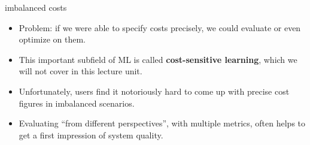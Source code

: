 \documentclass[11pt,compress,t,notes=noshow, xcolor=table]{beamer}
\begin{document}
\begin{vbframe}{imbalanced costs}
\lz

\begin{itemize}
  \item Problem: if we were able to specify costs precisely, we could evaluate 
  or even optimize on them.
  \item This important subfield of ML is called \textbf{cost-sensitive 
  learning}, which we will not cover in this lecture unit.
  \item Unfortunately, users find it notoriously hard to come up with 
  precise cost figures in imbalanced scenarios.
  \item Evaluating \enquote{from different perspectives}, with multiple metrics, 
  often helps to get a first impression of system quality.
\end{itemize}
 
\end{vbframe}
 
 

\end{document}
